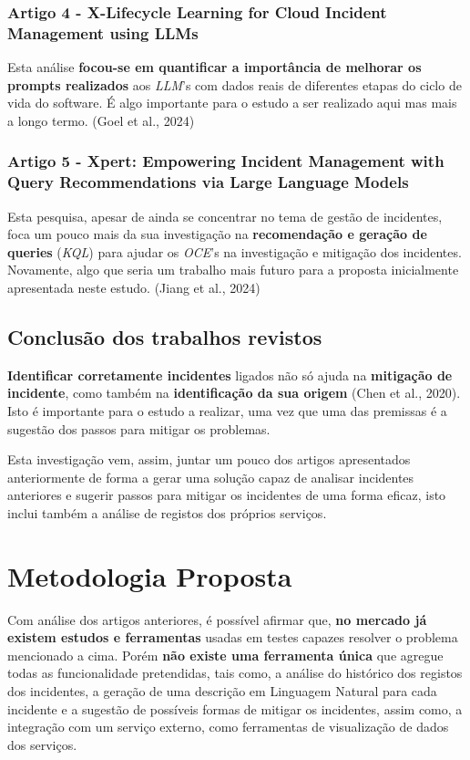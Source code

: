 		\subsubsection{Artigo 4 - X-Lifecycle Learning for Cloud Incident Management using LLMs}
			Esta análise \textbf{focou-se em quantificar a importância de melhorar os prompts realizados} aos \textit{LLM}'s com dados reais de diferentes etapas do ciclo de vida do software. É algo importante para o estudo a ser realizado aqui mas mais a longo termo. (Goel et al., 2024)
		
		\subsubsection{Artigo 5 - Xpert: Empowering Incident Management with Query Recommendations via Large Language Models}
			Esta pesquisa, apesar de ainda se concentrar no tema de gestão de incidentes, foca um pouco mais da sua investigação na \textbf{recomendação e geração de queries} (\textit{KQL}) para ajudar os \textit{OCE}'s na investigação e mitigação dos incidentes. Novamente, algo que seria um trabalho mais futuro para a proposta inicialmente apresentada neste estudo. (Jiang et al., 2024)
		
	\subsection{Conclusão dos trabalhos revistos}
		 \textbf{Identificar corretamente incidentes} ligados não só ajuda na \textbf{mitigação de incidente}, como também na \textbf{identificação da sua origem} (Chen et al., 2020). Isto é importante para o estudo a realizar, uma vez que uma das premissas é a sugestão dos passos para mitigar os problemas.
		
		Esta investigação vem, assim, juntar um pouco dos artigos apresentados anteriormente de forma a gerar uma solução capaz de analisar incidentes anteriores e sugerir passos para mitigar os incidentes de uma forma eficaz, isto inclui também a análise de registos dos próprios serviços.

\section{Metodologia Proposta}
	Com análise dos artigos anteriores, é possível afirmar que, \textbf{no mercado já existem estudos e ferramentas} usadas em testes capazes resolver o problema mencionado a cima. Porém \textbf{não existe uma ferramenta única} que agregue todas as funcionalidade pretendidas, tais como, a análise do histórico dos registos dos incidentes, a geração de uma descrição em Linguagem Natural para cada incidente e a sugestão de possíveis formas de mitigar os incidentes, assim como, a integração com um serviço externo, como ferramentas de visualização de dados dos serviços.
	
